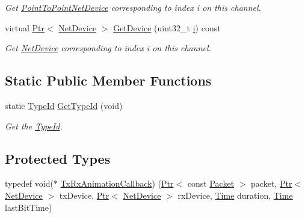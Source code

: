 \begin{DoxyCompactItemize}
\begin{DoxyCompactList}\small\item\em Get \hyperlink{classns3_1_1PointToPointNetDevice}{Point\+To\+Point\+Net\+Device} corresponding to index i on this channel. \end{DoxyCompactList}\item 
virtual \hyperlink{classns3_1_1Ptr}{Ptr}$<$ \hyperlink{classns3_1_1NetDevice}{Net\+Device} $>$ \hyperlink{classns3_1_1PointToPointChannel_a6d35f987220b14627ff078a944314351}{Get\+Device} (uint32\+\_\+t \hyperlink{lte__uplink__power__control_8m_a6f6ccfcf58b31cb6412107d9d5281426}{i}) const 
\begin{DoxyCompactList}\small\item\em Get \hyperlink{classns3_1_1NetDevice}{Net\+Device} corresponding to index i on this channel. \end{DoxyCompactList}\end{DoxyCompactItemize}
\subsection*{Static Public Member Functions}
\begin{DoxyCompactItemize}
\item 
static \hyperlink{classns3_1_1TypeId}{Type\+Id} \hyperlink{classns3_1_1PointToPointChannel_ab5e3b68bc87dc825920c0eda06c960f4}{Get\+Type\+Id} (void)
\begin{DoxyCompactList}\small\item\em Get the \hyperlink{classns3_1_1TypeId}{Type\+Id}. \end{DoxyCompactList}\end{DoxyCompactItemize}
\subsection*{Protected Types}
\begin{DoxyCompactItemize}
\item 
typedef void($\ast$ \hyperlink{classns3_1_1PointToPointChannel_aa7858042c262456ac1cf8ac9b2064d64}{Tx\+Rx\+Animation\+Callback}) (\hyperlink{classns3_1_1Ptr}{Ptr}$<$ const \hyperlink{classns3_1_1Packet}{Packet} $>$ packet, \hyperlink{classns3_1_1Ptr}{Ptr}$<$ \hyperlink{classns3_1_1NetDevice}{Net\+Device} $>$ tx\+Device, \hyperlink{classns3_1_1Ptr}{Ptr}$<$ \hyperlink{classns3_1_1NetDevice}{Net\+Device} $>$ rx\+Device, \hyperlink{classns3_1_1Time}{Time} duration, \hyperlink{classns3_1_1Time}{Time} last\+Bit\+Time)
\end{DoxyCompactItemize}
